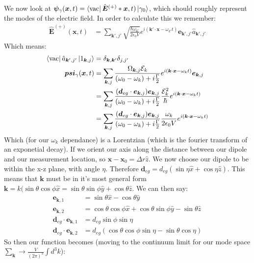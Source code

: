 We now look at $\bm{\psi}_\gamma(\bm{x},t) = \bra{\text{vac}}\hat{\bm{E}}^{(+)}*\bm{x},t)\ket{\gamma_0}$, which should roughly represent the modes of the electric field. In order to calculate this we remember:
\begin{align*}
	\hat{\bm{E}}^{(+)}(\bm{x},t) &= \sum_{\bm{k}',j'} \sqrt{\frac{\hbar\omega_{k'}}{2\epsilon_0 V}} e^{i(\bm{k}'\cdot\bm{x} - \omega_{k'} t)} \bm{e}_{\bm{k}',j'} \hat{a}_{\bm{k}',j'}
\end{align*}
Which means:
\begin{align*}
	\bra{\text{vac}}\hat{a}_{\bm{k}',j'}\ket{1_{\bm{k},j}} &= \delta_{\bm{k},\bm{k}'}\delta_{j,j'} \\
	\bm{psi}_\gamma(\bm{x},t)&= \sum_{\bm{k},j} \frac{\Omega_{\bm{k},j} \mathcal{E}_k}{(\omega_0 - \omega_k) + i\frac{\Gamma}{2}} e^{i(\bm{k}\cdot\bm{x} -\omega_k t)} \bm{e}_{\bm{k},j} \\
	&= \sum_{\bm{k},j} \frac{(\bm{d}_{eg}\cdot\bm{e}_{\bm{k},j})\bm{e}_{\bm{k},j}}{(\omega_0 - \omega_k) + i\frac{\Gamma}{2}}\frac{\mathcal{E}_k^2}{\hbar} e^{i(\bm{k}\cdot\bm{x} -\omega_k t)}  \\
	&= \sum_{\bm{k},j} \frac{(\bm{d}_{eg}\cdot\bm{e}_{\bm{k},j})\bm{e}_{\bm{k},j}}{(\omega_0 - \omega_k) + i\frac{\Gamma}{2}}\frac{\omega_k}{2\epsilon_0 V} e^{i(\bm{k}\cdot\bm{x} -\omega_k t)}
\end{align*}
Which (for our $\omega_k$ dependance) is a Lorentzian (which is the fourier transform of an exponetial decay).
If we orient our axis along the distance between our dipole and our measurement location, so $\bm{x} - \bm{x}_0 = \Delta r \hat{z}$. We now choose our dipole to be within the x-z plane, with angle $\eta$.
Therefore $\bm{d}_{eg} = d_{eg} (\sin\eta \hat{x} + \cos\eta \hat{z})$. This means that $\bm{k}$ must be in it's most general form $\bm{k} = k(\sin\theta\cos\phi\hat{x} = \sin\theta\sin\phi\hat{y} + \cos\theta\hat{z}$. We can then say:
\begin{align*}
	\bm{e}_{\bm{k},1} &= \sin\theta\hat{x} - \cos\theta\hat{y} \\
	\bm{e}_{\bm{k},2} &= \cos\theta\cos\phi\hat{x} +\cos\theta\sin\phi\hat{y} - \sin\theta\hat{z} \\
	\bm{d}_{eg}\cdot\bm{e}_{\bm{k},1} &= d_{eg}\sin\phi\sin\eta \\
	\bm{d}_{eg}\cdot\bm{e}_{\bm{k},2} &= d_{eg}(\cos\theta\cos\phi\sin\eta - \sin\theta\cos\eta)
\end{align*}
So then our function becomes (moving to the continuum limit for our mode space $\sum_{\bm{k}} \to \frac{V}{(2\pi)^3}\int d^3k$):
